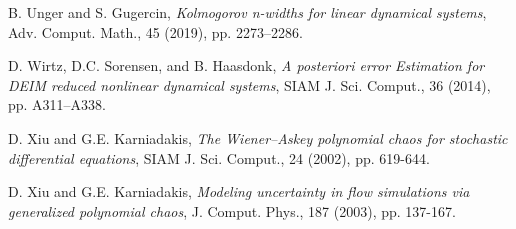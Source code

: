 \documentclass[10pt,a4paper]{article}
\numberwithin{equation}{section}
\numberwithin{lemma}{section}
\numberwithin{example}{section}
\numberwithin{definition}{section}
\numberwithin{assumption}{section}
\numberwithin{theorem}{section}
\numberwithin{proposition}{section}
\numberwithin{corollary}{section}
\numberwithin{remark}{section}
\begin{document}
\begin{thebibliography}{}
    
    {\sc B. Unger and S. Gugercin}, {\em Kolmogorov n-widths for linear dynamical systems}, Adv. Comput. Math., 45 (2019), pp. 2273–2286.
    
    {\sc  D. Wirtz, D.C. Sorensen, and B. Haasdonk}, {\em A posteriori error Estimation for DEIM reduced nonlinear dynamical systems}, SIAM J. Sci. Comput., 36 (2014), pp. A311–A338.
    
    {\sc D. Xiu and G.E. Karniadakis}, {\em  The Wiener--Askey polynomial chaos for stochastic differential equations}, SIAM J. Sci. Comput., 24 (2002), pp. 619-644.

    {\sc D. Xiu and G.E. Karniadakis}, {\em  Modeling uncertainty in flow simulations via generalized polynomial chaos}, J. Comput. Phys., 187 (2003), pp. 137-167.

    
   
\end{thebibliography}
\end{document}
